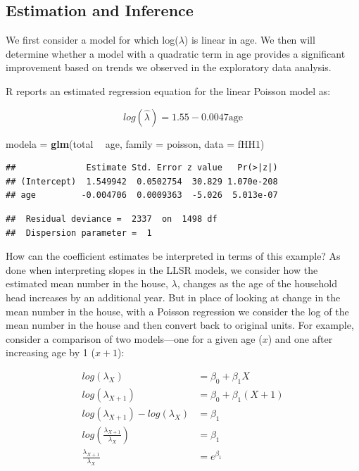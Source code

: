\documentclass[
]{krantz}
\newenvironment{Shaded}{\begin{snugshade}}{\end{snugshade}}
\newcommand{\DataTypeTok}[1]{\textcolor[rgb]{0.27,0.27,0.27}{#1}}
\newcommand{\KeywordTok}[1]{\textcolor[rgb]{0.27,0.27,0.27}{\textbf{#1}}}
\newcommand{\NormalTok}[1]{#1}
\newcommand{\OperatorTok}[1]{\textcolor[rgb]{0.43,0.43,0.43}{\textbf{#1}}}
\newcommand{\StringTok}[1]{\textcolor[rgb]{0.5,0.5,0.5}{#1}}
\begin{document}
\hypertarget{sec-PoisInference}{%
\subsection{Estimation and Inference}\label{sec-PoisInference}}

We first consider a model for which log(\(\lambda\)) is linear in age. We then will determine whether a model with a quadratic term in age provides a significant improvement based on trends we observed in the exploratory data analysis.

R reports an estimated regression equation for the linear Poisson model as:

\begin{equation*}
log(\hat{\lambda}) = 1.55 - 0.0047 \textrm{age}
\end{equation*}

\begin{Shaded}
\begin{Highlighting}[]
\NormalTok{modela =}\StringTok{ }\KeywordTok{glm}\NormalTok{(total }\OperatorTok{~}\StringTok{ }\NormalTok{age, }\DataTypeTok{family =}\NormalTok{ poisson, }\DataTypeTok{data =}\NormalTok{ fHH1)}
\end{Highlighting}
\end{Shaded}

\begin{verbatim}
##              Estimate Std. Error z value   Pr(>|z|)
## (Intercept)  1.549942  0.0502754  30.829 1.070e-208
## age         -0.004706  0.0009363  -5.026  5.013e-07
\end{verbatim}

\begin{verbatim}
##  Residual deviance =  2337  on  1498 df 
##  Dispersion parameter =  1
\end{verbatim}

How can the coefficient estimates be interpreted in terms of this example? As done when interpreting slopes in the LLSR models, we consider how the estimated mean number in the house, \(\lambda\), changes as the age of the household head increases by an additional year. But in place of looking at change in the mean number in the house, with a Poisson regression we consider the log of the mean number in the house and then convert back to original units. For example, consider a comparison of two models---one for a given age (\(x\)) and one after increasing age by 1 (\(x+1\)):

\begin{equation}
\begin{split}
log(\lambda_X) &= \beta_0 + \beta_1X \\
log(\lambda_{X+1}) &= \beta_0 + \beta_1(X+1) \\
log(\lambda_{X+1})-log(\lambda_X) &=  \beta_1 \\
log \left(\frac{\lambda_{X+1}}{\lambda_X}\right)   &= \beta_1\\
\frac{\lambda_{X+1}}{\lambda_X} &= e^{\beta_1}
\end{split}
\label{eq:rateRatio}
\end{equation}
\end{document}
